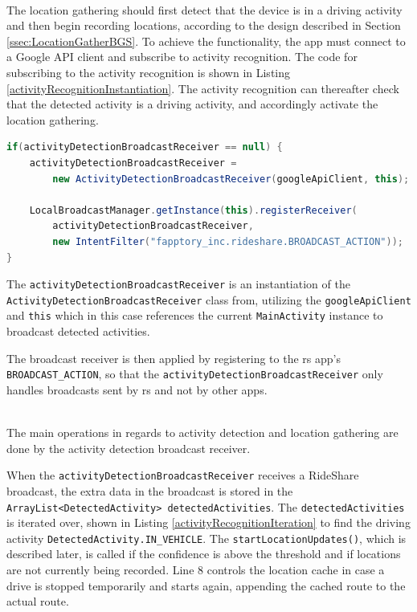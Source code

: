 \DIFaddend %
\DIFaddbegin \textbf{}\\
\DIFaddend The location gathering should first detect that the device is in a driving activity and then begin recording locations, according to the design described in Section \ref{ssec:LocationGatherBGS}.
To achieve the functionality, the app must connect to a Google API client and subscribe to activity recognition.
The code for subscribing to the activity recognition is shown in Listing \ref{activityRecognitionInstantiation}.
The activity recognition can thereafter check that the detected activity is a driving activity, and accordingly activate the location gathering.

\begin{lstlisting}[language=Java, label=activityRecognitionInstantiation, caption=Initialization of activity recognition.]
if(activityDetectionBroadcastReceiver == null) {
	activityDetectionBroadcastReceiver = 
		new ActivityDetectionBroadcastReceiver(googleApiClient, this);

	LocalBroadcastManager.getInstance(this).registerReceiver(
		activityDetectionBroadcastReceiver, 
		new IntentFilter("fapptory_inc.rideshare.BROADCAST_ACTION"));
}
\end{lstlisting}

The \texttt{activityDetectionBroadcastReceiver} is an instantiation of the\\ \texttt{ActivityDetectionBroadcastReceiver} class from, utilizing the \texttt{googleApiClient} and \texttt{this} which in this case references the current \texttt{MainActivity} instance to broadcast detected activities.

The broadcast receiver is then applied by registering to the \gls{rs} app's\\ \texttt{BROADCAST\_ACTION}, so that the \texttt{activityDetectionBroadcastReceiver} only handles broadcasts sent by \gls{rs} and not by other apps.




\DIFaddbegin \textbf{}\\
\DIFaddend The main operations in regards to activity detection and location gathering are done by the activity detection broadcast receiver.

When the \texttt{activityDetectionBroadcastReceiver} receives a RideShare broadcast, the extra data in the broadcast is stored in the \texttt{ArrayList<DetectedActivity> detectedActivities}.
The \texttt{detectedActivities} is iterated over, shown in Listing \ref{activityRecognitionIteration} to find the driving activity \texttt{DetectedActivity.IN\_VEHICLE}.
The \texttt{startLocationUpdates()}, which is described later, is called if the confidence is above the threshold and if locations are not currently being recorded.
Line 8 controls the location cache in case a drive is stopped temporarily and starts again, appending the cached route to the actual route.

